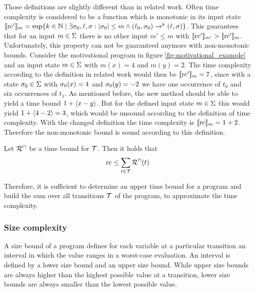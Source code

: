 Those definitions are slightly different than in related work. 
Often time complexity is considered to be a function which is monotonic in its input state $\llbracket \text{rc}' \rrbracket_{m} = \sup \lbrace  k \in \mathbb{N} \mid \exists \sigma_0, \ell, \sigma: \left|\sigma_0\right| \leq m \wedge (\ell_0, \sigma_0) \rightarrow^k (\ell, \sigma)  \rbrace$.
This guarantees that for an input $m \in \Sigma$ there is no other input $m' \leq m$ with $\llbracket \text{rc}' \rrbracket_{m'} > \llbracket \text{rc}' \rrbracket_{m}$.
Unfortunately, this property can not be guaranteed anymore with non-monotonic bounds.
Consider the motivational program in figure \ref{fig:motivational_example} and an input state $m \in \Sigma$ with $m(x) = 4$ and $m(y) = 2$.
The time complexity according to the definition in related work would then be $\llbracket \text{rc}' \rrbracket_{m} = 7$, since with a state $\sigma_0 \in \Sigma$ with $\sigma_0(x) = 4$ and $\sigma_0(y) = -2$ we have one occurrence of $t_0$ and six occurrences of $t_1$.
As mentioned before, the new method should be able to yield a time bound $1 + \langle x-y\rangle$.
But for the defined input state $m \in \Sigma$ this would yield $1 + \langle4-2\rangle = 3$, which would be unsound according to the definition of time complexity.
With the changed definition the time complexity is $\llbracket \text{rc} \rrbracket_{m} = 1 + 2$.
Therefore the non-monotonic bound is sound according to this definition.


\begin{theorem}
	Let ${\mathcal{R}^\sqcap}$ be a time bound for $\mathcal{T}$.
	Then it holds that 
	\[ \text{rc} \leq \sum_{t \in \mathcal{T}}{\mathcal{R}^\sqcap}(t) \]
\end{theorem}

Therefore, it is sufficient to determine an upper time bound for a program and build the sum over all transitions $\mathcal{T}$ of the program, to approximate the time complexity. 

\subsubsection{Size complexity}

A size bound of a program defines for each variable at a particular transition an interval in which the value ranges in a worst-case evaluation.
An interval is defined by a lower size bound and an upper size bound.
While upper size bounds are always higher than the highest possible value at a transition, lower size bounds are always smaller than the lowest possible value.

